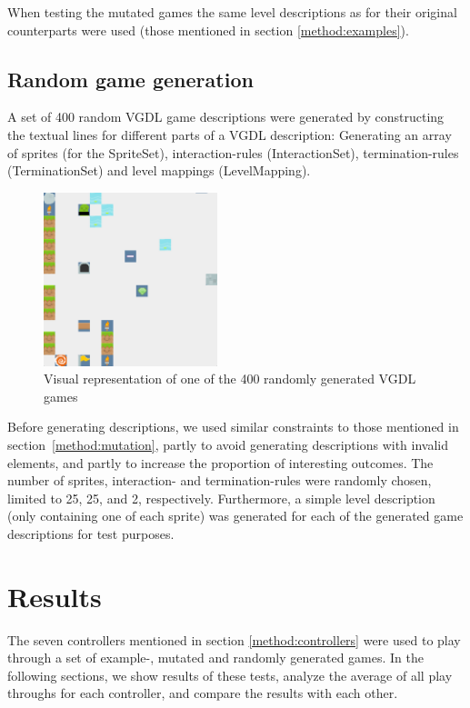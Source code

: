 \documentclass{llncs}
\begin{document}
When testing the mutated games the same level descriptions as for their original counterparts were used (those mentioned in section \ref{method:examples}).




\subsection{Random game generation}
\label{method:random}

A set of 400 random VGDL game descriptions were generated by constructing the textual lines for different parts of a VGDL description: Generating an array of sprites (for the SpriteSet), interaction-rules (InteractionSet), termination-rules (TerminationSet) and level mappings (LevelMapping).


\begin{figure}[ht]
	\centering
	\includegraphics[width=0.45\textwidth]{gengame.png}
	\caption{Visual representation of one of the 400 randomly generated VGDL games}
\end{figure}

Before generating descriptions, we used similar constraints to those mentioned in section~\ref{method:mutation}, partly to avoid generating descriptions with invalid elements, and partly to increase the proportion of interesting outcomes. 
The number of sprites, interaction- and termination-rules were randomly chosen, limited to 25, 25, and 2, respectively. Furthermore, a simple level description (only containing one of each sprite) was generated for each of the generated game descriptions for test purposes. 



\section{Results}
\label{sec:result}
The seven controllers mentioned in section \ref{method:controllers} were used to play through a set of example-, mutated and randomly generated games. In the following sections, we show results of these tests, analyze the average of all play throughs for each controller, and compare the results with each other.
\end{document}
